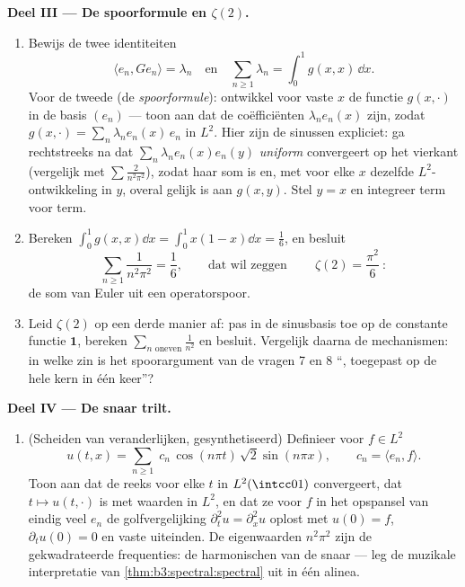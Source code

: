 \begin{problem}
\medskip
\noindent\textbf{Deel III --- De spoorformule en $\zeta(2)$.}
\begin{enumerate}[resume]
  \item Bewijs de twee identiteiten
        \[
        \langle e_n, Ge_n\rangle = \lambda_n
        \quad\text{en}\quad
        \sum_{n\geq1}\lambda_n = \int_0^1 g(x,x)\,\dd x .
        \]
        Voor de tweede (de \emph{spoorformule}): ontwikkel voor
        vaste $x$ de functie $g(x, \cdot)$ in de basis $(e_n)$
        --- toon aan dat de coëfficiënten $\lambda_ne_n(x)$ zijn,
        zodat $g(x, \cdot) = \sum_n\lambda_ne_n(x)\,e_n$ in
        $L^2$. Hier zijn de sinussen expliciet: ga rechtstreeks
        na dat $\sum_n\lambda_ne_n(x)e_n(y)$ \emph{uniform}
        convergeert op het vierkant (vergelijk met $\sum
        \frac2{n^2\pi^2}$), zodat haar som  is en, met
        voor elke $x$ dezelfde $L^2$-ontwikkeling in $y$, overal
        gelijk is aan $g(x,y)$. Stel $y = x$ en integreer term
        voor term.
  \item Bereken $\int_0^1g(x,x)\dd x = \int_0^1x(1-x)\dd x =
        \frac16$, en besluit
        \[
        \sum_{n\geq1}\frac{1}{n^2\pi^2} = \frac16,
        \qquad\text{dat wil zeggen}\qquad
        \boxed{\ \zeta(2) = \frac{\pi^2}{6}\ } :
        \]
        de som van Euler uit een operatorspoor.
  \item Leid $\zeta(2)$ op een derde manier af: pas  in
        de sinusbasis toe op de constante functie $\mathbf 1$,
        bereken $\sum_{n \text{ oneven}}\frac1{n^2}$ en besluit.
        Vergelijk daarna de mechanismen: in welke zin is het
        spoorargument van de vragen 7 en 8 ``, toegepast
        op de hele kern in één keer''?
\end{enumerate}

\medskip
\noindent\textbf{Deel IV --- De snaar trilt.}
\begin{enumerate}[resume]
  \item (Scheiden van veranderlijken, gesynthetiseerd) Definieer
        voor $f \in L^2$
        \[
        u(t, x) = \sum_{n\geq1}\;c_n\,
        \cos(n\pi t)\,\sqrt2\sin(n\pi x),
        \qquad c_n = \langle e_n, f\rangle .
        \]
        Toon aan dat de reeks voor elke $t$ in $L^2(\intcc01)$
        convergeert, dat $t\mapsto u(t, \cdot)$  is met
        waarden in $L^2$, en dat ze voor $f$ in het opspansel van
        eindig veel $e_n$ de golfvergelijking $\partial_t^2u =
        \partial_x^2u$ oplost met $u(0) = f$, $\partial_tu(0) =
        0$ en vaste uiteinden. De eigenwaarden $n^2\pi^2$ zijn de
        gekwadrateerde frequenties: de harmonischen van de snaar
        --- leg de muzikale interpretatie van
        \cref{thm:b3:spectral:spectral} uit in één alinea.
\end{enumerate}


\end{problem}
